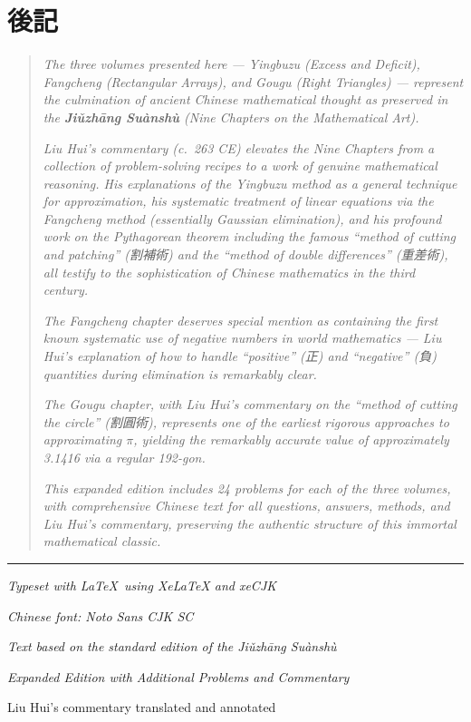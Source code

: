 \documentclass[11pt,a4paper]{article}
\begin{document}
\newpage
\section*{後記}


\begin{quote}
\textit{The three volumes presented here --- Yingbuzu (Excess and Deficit), Fangcheng (Rectangular Arrays), and Gougu (Right Triangles) --- represent the culmination of ancient Chinese mathematical thought as preserved in the \textbf{Jiǔzhāng Suànshù} (Nine Chapters on the Mathematical Art).}

\textit{Liu Hui's commentary (c.~263 CE) elevates the Nine Chapters from a collection of problem-solving recipes to a work of genuine mathematical reasoning. His explanations of the Yingbuzu method as a general technique for approximation, his systematic treatment of linear equations via the Fangcheng method (essentially Gaussian elimination), and his profound work on the Pythagorean theorem including the famous ``method of cutting and patching'' (割補術) and the ``method of double differences'' (重差術), all testify to the sophistication of Chinese mathematics in the third century.}

\textit{The Fangcheng chapter deserves special mention as containing the first known systematic use of negative numbers in world mathematics --- Liu Hui's explanation of how to handle ``positive'' (正) and ``negative'' (負) quantities during elimination is remarkably clear.}

\textit{The Gougu chapter, with Liu Hui's commentary on the ``method of cutting the circle'' (割圓術), represents one of the earliest rigorous approaches to approximating $\pi$, yielding the remarkably accurate value of approximately 3.1416 via a regular 192-gon.}

\textit{This expanded edition includes 24 problems for each of the three volumes, with comprehensive Chinese text for all questions, answers, methods, and Liu Hui's commentary, preserving the authentic structure of this immortal mathematical classic.}
\end{quote}

\vspace{1cm}

\begin{center}
\rule{0.4\textwidth}{0.4pt}

\vspace{0.5cm}

{\small\textit{Typeset with \LaTeX\ using XeLaTeX and xeCJK}}

{\small\textit{Chinese font: Noto Sans CJK SC}}

{\small\textit{Text based on the standard edition of the Jiǔzhāng Suànshù}}

{\small\textit{Expanded Edition with Additional Problems and Commentary}}

\vspace{0.5cm}

{\small Liu Hui's commentary translated and annotated}
\end{center}
\end{document}
